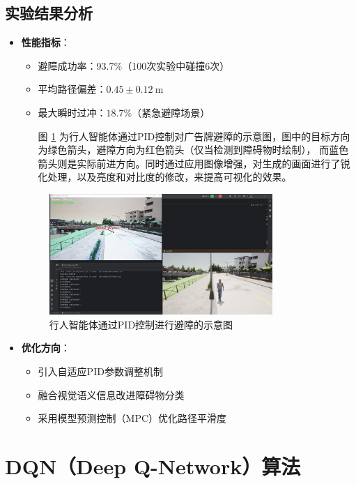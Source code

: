 \subsection{实验结果分析}
\begin{itemize}
    \item \textbf{性能指标}：
    \begin{itemize}
        \item 避障成功率：93.7\%（100次实验中碰撞6次）
        \item 平均路径偏差：$0.45\pm0.12\ \text{m}$
        \item 最大瞬时过冲：$18.7\%$（紧急避障场景）

	图 \ref{fig:pid_obstacle} 为行人智能体通过PID控制对广告牌避障的示意图，图中的目标方向为绿色箭头，避障方向为红色箭头（仅当检测到障碍物时绘制），	而蓝色箭头则是实际前进方向。同时通过应用图像增强，对生成的画面进行了锐化处理，以及亮度和对比度的修改，来提高可视化的效果。

    \end{itemize}

\begin{figure}[H]
    \centering
    \includegraphics[width=0.8\textwidth]{images/obstacle_avoidance.pdf}
    \caption{行人智能体通过PID控制进行避障的示意图}
    \label{fig:pid_obstacle}
\end{figure}
    
    \item \textbf{优化方向}：
    \begin{itemize}
        \item 引入自适应PID参数调整机制
        \item 融合视觉语义信息改进障碍物分类
        \item 采用模型预测控制（MPC）优化路径平滑度
    \end{itemize}
\end{itemize}

\section{DQN（Deep Q-Network）算法}
